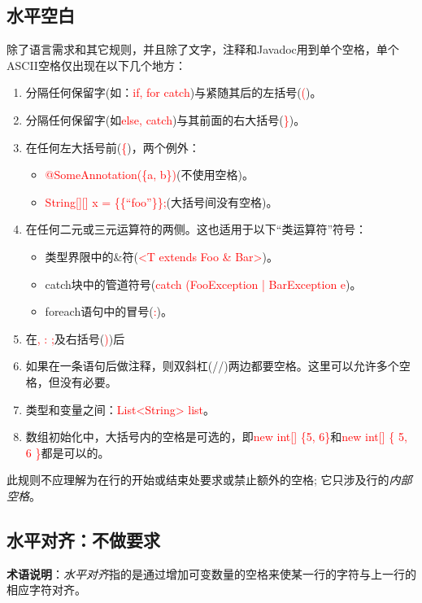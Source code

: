 \documentclass[cn,11pt,chinese]{elegantbook}
\begin{document}
\subsection{水平空白}
除了语言需求和其它规则，并且除了文字，注释和Javadoc用到单个空格，单个ASCII空格仅出现在以下几个地方：
\begin{enumerate}
	\item 分隔任何保留字(如：\textcolor{red}{if, for catch})与紧随其后的左括号(\textcolor{red}{(})。
	\item 分隔任何保留字(如\textcolor{red}{else, catch})与其前面的右大括号(\textcolor{red}{\}})。
	\item 在任何左大括号前(\textcolor{red}{\{})，两个例外：
	\begin{itemize}
		\item \textcolor{red}{@SomeAnnotation(\{a, b\})}(不使用空格)。
		\item \textcolor{red}{String[][] x = \{\{``foo''\}\};}(大括号间没有空格)。
	\end{itemize}
	\item 在任何二元或三元运算符的两侧。这也适用于以下``类运算符''符号：
	\begin{itemize}
		\item 类型界限中的\&符(\textcolor{red}{<T extends Foo \& Bar>})。
		\item catch块中的管道符号(\textcolor{red}{catch (FooException | BarException e})。
		\item foreach语句中的冒号(\textcolor{red}{:})。
	\end{itemize}
	\item 在\textcolor{red}{, : ;}及右括号(\textcolor{red}{)})后
	\item 如果在一条语句后做注释，则双斜杠(//)两边都要空格。这里可以允许多个空格，但没有必要。
	\item 类型和变量之间：\textcolor{red}{List<String> list}。
	\item 数组初始化中，大括号内的空格是可选的，即\textcolor{red}{new int[] \{5, 6\}}和\textcolor{red}{new int[] \{ 5, 6 \}}都是可以的。
\end{enumerate}

此规则不应理解为在行的开始或结束处要求或禁止额外的空格; 它只涉及行的\emph{内部空格}。

\subsection{水平对齐：不做要求}
\textbf{术语说明}：\emph{水平对齐}指的是通过增加可变数量的空格来使某一行的字符与上一行的相应字符对齐。
\end{document}
